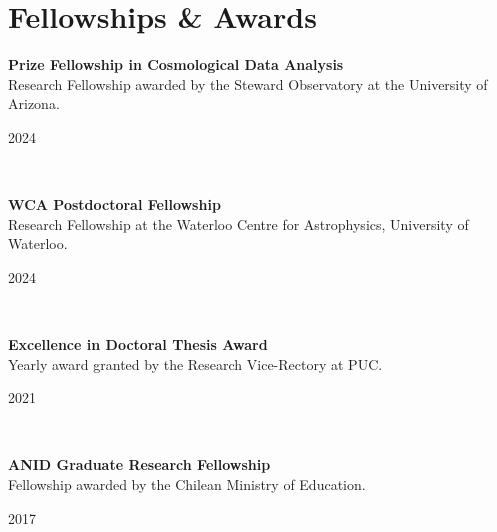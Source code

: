 \documentclass[12pt, a4paper]{article} %
\begin{document}
\section*{Fellowships \& Awards}

\begin{minipage}[t]{0.7\textwidth}
\begin{flushleft}%
  \setlength{\leftskip}{0.2cm}%
\textbf{Prize Fellowship in Cosmological Data Analysis}\\
 Research Fellowship awarded by the Steward Observatory at the University of Arizona.
 \end{flushleft}
\end{minipage}
\begin{minipage}[t]{0.3\textwidth}
\hfill 2024
\end{minipage}\\

\begin{minipage}[t]{0.7\textwidth}
\begin{flushleft}%
  \setlength{\leftskip}{0.2cm}%
\textbf{WCA Postdoctoral Fellowship}\\
 Research Fellowship at the Waterloo Centre for Astrophysics, University of Waterloo.
 \end{flushleft}
\end{minipage}
\begin{minipage}[t]{0.3\textwidth}
\hfill 2024
\end{minipage}\\

\begin{minipage}[t]{0.7\textwidth}
\begin{flushleft}%
  \setlength{\leftskip}{0.2cm}%
\textbf{Excellence in Doctoral Thesis Award}\\
 Yearly award granted by the Research Vice-Rectory at PUC.
 \end{flushleft}
\end{minipage}
\begin{minipage}[t]{0.3\textwidth}
\hfill 2021
\end{minipage}\\

\begin{minipage}[t]{0.7\textwidth}
\begin{flushleft}%
  \setlength{\leftskip}{0.2cm}%
\textbf{ANID Graduate Research Fellowship}\\
Fellowship awarded by the Chilean Ministry of Education.
\end{flushleft}
\end{minipage}
\begin{minipage}[t]{0.3\textwidth}
\hfill 2017
\end{minipage}\\
\end{document}
